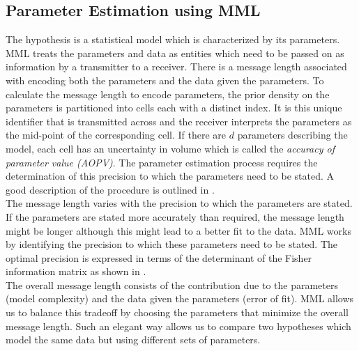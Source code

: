 \documentclass[wcp]{jmlr}
\begin{document}
\subsection{Parameter Estimation using MML}
The hypothesis is a statistical model which is characterized by its parameters.
MML treats the parameters and data as entities which need to be passed on as 
information by a transmitter to a receiver. There is a message length associated
with encoding both the parameters and the data given the parameters. To calculate the message length
to encode parameters, the prior density on the parameters is partitioned into cells
each with a distinct index. It is this unique identifier that is transmitted across and the
receiver interprets the parameters as the mid-point of the corresponding cell. If there are $d$
parameters describing the model, each cell has an uncertainty in volume which is called the
\emph{accuracy of parameter value (AOPV)}. The parameter estimation process requires the
determination of this precision to which the parameters need to be stated. A good
description of the procedure is outlined in \citet{oliver1994mml}. \\

The message length varies with the precision to which the parameters are stated. 
If the parameters are stated more accurately than required, the 
message length might be longer although this might lead to a better fit to the data. 
MML works by identifying the precision to which these 
parameters need to be stated. The optimal precision is expressed in terms of the 
determinant of the Fisher information matrix as shown in \citet{oliver1994mml}. \\

The overall message length consists of the contribution due to the parameters (model complexity) 
and the data given the parameters (error of fit). MML allows us to balance this tradeoff
by choosing the parameters that minimize the overall message length. Such an elegant way 
allows us to compare two hypotheses which model the same data but using different sets of parameters.
\end{document}
